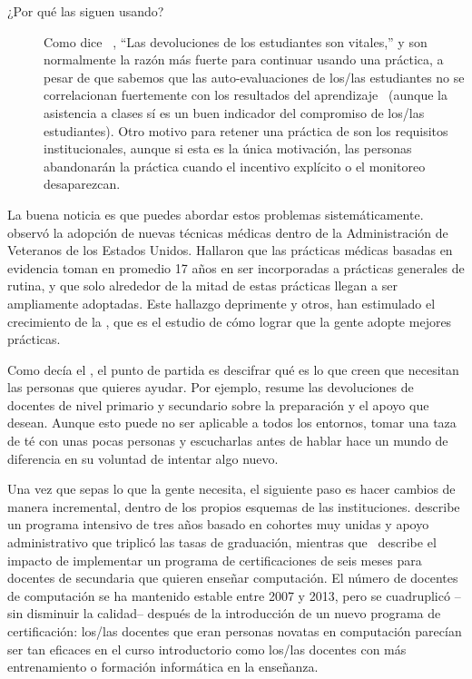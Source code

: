 \begin{description}
\item[¿Por qué las siguen usando?]

  Como dice ~\cite{Bark2015}, ``Las devoluciones de los estudiantes son vitales,''
y son normalmente la razón más fuerte para continuar usando una práctica,
a pesar de que sabemos que las auto-evaluaciones de los/las estudiantes no se correlacionan fuertemente con los resultados del aprendizaje~\cite{Star2014,Uttl2017}
(aunque la asistencia a clases sí es un buen indicador del compromiso de los/las estudiantes).
Otro motivo para retener una práctica de son los requisitos institucionales,
aunque si esta es la única motivación,
las personas abandonarán la práctica 
cuando el incentivo explícito o el  monitoreo desaparezcan.

\end{description}

La buena noticia es que puedes abordar estos problemas sistemáticamente.
\cite{Baue2015} observó  la adopción de nuevas técnicas médicas dentro de la Administración de Veteranos de los Estados Unidos.
 Hallaron que las prácticas médicas basadas en evidencia
toman en promedio 17 años en ser incorporadas a prácticas generales de rutina,
y que solo alrededor de la mitad de estas prácticas llegan a ser ampliamente adoptadas.
Este hallazgo deprimente y otros, han estimulado el crecimiento de la
,
que es el estudio de cómo lograr que la gente adopte mejores prácticas.

Como decía el ,
el punto de partida es descifrar qué es lo que creen que necesitan las personas que quieres ayudar.
Por ejemplo, \cite{Yada2016} resume las devoluciones de docentes de nivel primario y secundario sobre la preparación y el apoyo que desean.
Aunque esto puede no ser aplicable a todos los entornos,
tomar una taza de té con unas pocas personas y escucharlas antes de hablar
hace un mundo de diferencia en su voluntad de intentar algo nuevo. 

Una vez que sepas lo que la gente necesita,
el siguiente paso es hacer cambios de manera incremental,
dentro de los propios esquemas de las instituciones.
\cite{Nara2018} describe un programa intensivo de tres años
basado en cohortes muy unidas y apoyo administrativo
que triplicó las tasas de graduación,
mientras que~\cite{Hu2017} describe el impacto de implementar un programa de certificaciones de seis meses para docentes de secundaria que quieren enseñar computación.
El  número de docentes de computación se ha mantenido estable entre 2007 y 2013,
pero se cuadruplicó --sin disminuir la calidad-- después de la introducción de un nuevo programa de certificación:
los/las docentes que eran personas novatas en computación parecían ser tan eficaces en el curso introductorio como los/las docentes con más entrenamiento o formación informática en la enseñanza.


